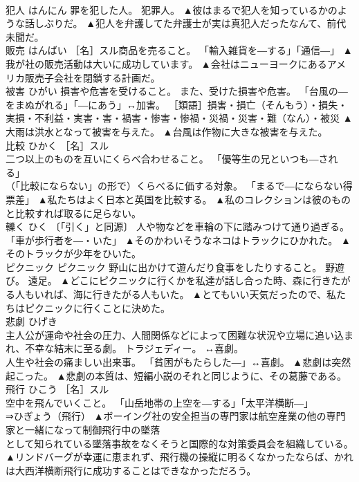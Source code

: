 \documentclass[8pt]{extreport}
\begin{document}
\begin{CJK}{UTF8}{min}
\\	犯人	はんにん	罪を犯した人。 犯罪人。	▲彼はまるで犯人を知っているかのような話しぶりだ。 ▲犯人を弁護してた弁護士が実は真犯人だったなんて、前代未聞だ。
\\	販売	はんばい	［名］スル商品を売ること。 「輸入雑貨を―する」「通信―」	▲我が社の販売活動は大いに成功しています。 ▲会社はニューヨークにあるアメリカ販売子会社を閉鎖する計画だ。
\\	被害	ひがい	損害や危害を受けること。 また、受けた損害や危害。 「台風の―をまぬがれる」「―にあう」↔加害。 ［類語］損害・損亡（そんもう）・損失・実損・不利益・実害・害・禍害・惨害・惨禍・災禍・災害・難（なん）・被災	▲大雨は洪水となって被害を与えた。 ▲台風は作物に大きな被害を与えた。
\\	比較	ひかく	［名］スル 
\\	二つ以上のものを互いにくらべ合わせること。 「優等生の兄といつも―される」 
\\	（「比較にならない」の形で）くらべるに価する対象。 「まるで―にならない得票差」	▲私たちはよく日本と英国を比較する。 ▲私のコレクションは彼のものと比較すれば取るに足らない。
\\	轢く	ひく	〔「引く」と同源〕 人や物などを車輪の下に踏みつけて通り過ぎる。 「車が歩行者を―・いた」	▲そのかわいそうなネコはトラックにひかれた。 ▲そのトラックが少年をひいた。
\\	ピクニック	ピクニック	野山に出かけて遊んだり食事をしたりすること。 野遊び。 遠足。	▲どこにピクニックに行くかを私達が話し合った時、森に行きたがる人もいれば、海に行きたがる人もいた。 ▲とてもいい天気だったので、私たちはピクニックに行くことに決めた。
\\	悲劇	ひげき	
\\	主人公が運命や社会の圧力、人間関係などによって困難な状況や立場に追い込まれ、不幸な結末に至る劇。 トラジェディー。 ↔喜劇。 
\\	人生や社会の痛ましい出来事。 「貧困がもたらした―」↔喜劇。	▲悲劇は突然起こった。 ▲悲劇の本質は、短編小説のそれと同じように、その葛藤である。
\\	飛行	ひこう	［名］スル 
\\	空中を飛んでいくこと。 「山岳地帯の上空を―する」「太平洋横断―」 
\\	⇒ひぎょう（飛行）	▲ボーイング社の安全担当の専門家は航空産業の他の専門家と一緒になって制御飛行中の墜落
\\	として知られている墜落事故をなくそうと国際的な対策委員会を組織している。 ▲リンドバーグが幸運に恵まれず、飛行機の操縦に明るくなかったならば、かれは大西洋横断飛行に成功することはできなかっただろう。

\end{CJK}
\end{document}
